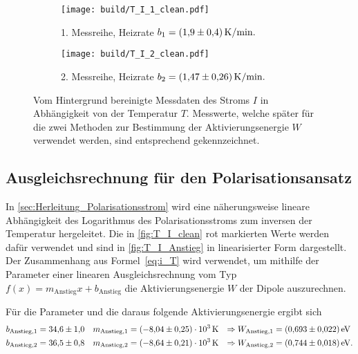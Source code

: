 \begin{figure}
    \centering
    \begin{subfigure}{\textwidth}
        \centering
        \texttt{[image: build/T\_I\_1\_clean.pdf]}
        \caption{1. Messreihe, Heizrate $b_1 = \qty{1.9+-0.4}{\kelvin\per\minute}.$}
        \label{fig:T_I_1_clean}
    \end{subfigure}
    \begin{subfigure}{\textwidth}
        \centering
        \texttt{[image: build/T\_I\_2\_clean.pdf]}
        \caption{2. Messreihe, Heizrate $b_2 = \qty{1.47+-0.26}{\kelvin\per\minute}.$}
        \label{fig:T_I_2_clean}
    \end{subfigure}
    \caption{Vom Hintergrund bereinigte Messdaten des Stroms $I$ in Abhängigkeit von der Temperatur $T$. Messwerte, welche später für die zwei Methoden zur Bestimmung %
    der Aktivierungsenergie $W$ verwendet werden, sind entsprechend gekennzeichnet.}
    \label{fig:T_I_clean}
\end{figure}

\subsection{Ausgleichsrechnung für den Polarisationsansatz}
\label{sec:Ausgleichsrechnung_Polarisationsansatz}
In \autoref{sec:Herleitung_Polarisationsstrom} wird eine näherungsweise lineare Abhängigkeit des Logarithmus des Polarisationsstroms zum inversen der Temperatur hergeleitet.
Die in \autoref{fig:T_I_clean} rot markierten Werte werden dafür verwendet und sind in \autoref{fig:T_I_Anstieg} in linearisierter Form dargestellt.
Der Zusammenhang aus Formel~\eqref{eq:i_T} wird verwendet, um mithilfe der Parameter einer linearen Ausgleichsrechnung vom Typ $f(x) = m_{\text{Anstieg}}x+b_{\text{Anstieg}}$ die
Aktivierungsenergie $W$ der Dipole auszurechnen.

Für die Parameter und die daraus folgende Aktivierungsenergie ergibt sich
\begin{align*}
    b_{\text{Anstieg}, 1} &= \num{34.6+-1.0} & m_{\text{Anstieg}, 1} &= \qty{-8.04(0.25)e+03}{\kelvin} &\Rightarrow W_{\text{Anstieg}, 1} &= \qty{0.693+-0.022}{\electronvolt} \\
    b_{\text{Anstieg}, 2} &= \num{36.5+-0.8} & m_{\text{Anstieg}, 2} &= \qty{-8.64(0.21)e+03}{\kelvin} &\Rightarrow W_{\text{Anstieg}, 2} &= \qty{0.744+-0.018}{\electronvolt}. \\
\end{align*}

